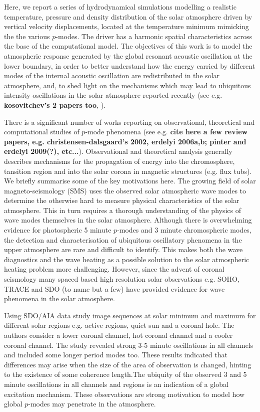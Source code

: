 \documentclass[preprint,authoryear,12pt]{elsarticle}
\begin{document}
Here, we report a series of hydrodynamical simulations modelling a realistic temperature, pressure and density distribution of the solar atmosphere driven by vertical velocity displacements,  located at the temperature minimum mimicking the the various $p$-modes. The driver has a harmonic spatial characteristics across the base of the computational model. The objectives of this work is to model the atmospheric response generated by the global resonant acoustic oscillation at the lower boundary, in order to better understand how the energy carried by different modes of the internal acoustic oscillation are redistributed in the solar atmosphere, and, to shed light on the mechanisms which may lead to ubiquitous intensity oscillations in the solar atmosphere reported recently (see e.g. {\bf kosovitchev's 2 papers too},  \citet{Ireland2015}).   

There is a significant number of works reporting on observational, theoretical and computational studies of $p$-mode phenomena (see e.g. {\bf cite here a few review papers, e.g. christensen-dalsgaard's 2002, erdelyi 2006a,b; pinter and erdelyi 2009(?), etc...}). Observational and theoretical analysis generally describes mechanisms for the propagation of energy into the chromosphere, tansition region and into the solar corona in magnetic structures (e.g. flux tubs). We briefly summarise some of the key motivations here. The growing field of solar magneto-seismology (SMS) uses the observed solar atmospheric wave modes to determine the otherwise hard to measure physical characteristics of the solar atmosphere. This in turn requires a thorough understanding of the physics of wave modes themselves in the solar atmosphere. Although there is overwhelming evidence for photospheric 5 minute $p$-modes and 3 minute chromospheric modes, the detection and characterisation of ubiquitous oscillatory phenomena in the upper atmosphere are rare and difficult to identify. This makes both the wave diagnostics and the wave heating as a possible solution to the solar atmospheric heating problem more challenging. However, since the advent of coronal seismology \citep[see the reviews e.g][]{Roberts1984, Banerjee2007, DeMoortel2005, Mathioudakis2013, Wang2009} many spaced based high resolution solar observations e.g. SOHO, TRACE and SDO (to name but a few) have provided evidence for wave phenomena in the solar atmosphere.

Using SDO/AIA data \citet{Erdelyi2017} study image sequences at solar minimum and maximum for different solar regions e.g. active regions, quiet sun and a coronal hole. The authors consider a lower coronal channel, hot coronal channel and a cooler coronal channel. The study revealed strong 3-5 minute oscillations in all channels and included some longer period modes too. These results indicated that differences may arise when the size of the area of observation is changed, hinting to the existence of some coherence length.The ubiquity of the observed 3 and 5 minute oscillations in all channels and regions is an indication of a global excitation mechanism. These observations are strong motivation to model how global $p$-modes may penetrate in the atmosphere. 
\end{document}
